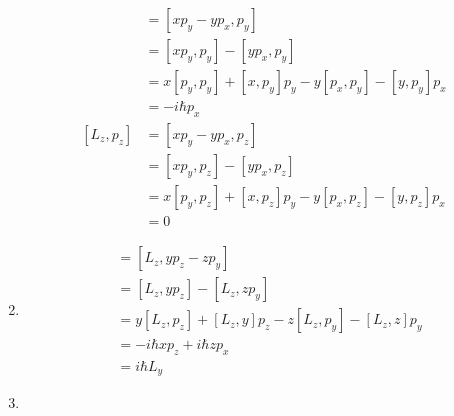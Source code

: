 \documentclass{article}
\begin{document}
\begin{enumerate}
\begin{align*}
          [L_z, p_y] & = [x p_y - y p_x, p_y]                                      \\
                     & = [x p_y, p_y] - [y p_x, p_y]                               \\
                     & = x [p_y, p_y] + [x, p_y] p_y - y [p_x, p_y] - [y, p_y] p_x \\
                     & = -i \hbar p_x                                              \\
          [L_z, p_z] & = [x p_y - y p_x, p_z]                                      \\
                     & = [x p_y, p_z] - [y p_x, p_z]                               \\
                     & = x [p_y, p_z] + [x, p_z] p_y - y [p_x, p_z] - [y, p_z] p_x \\
                     & = 0
        \end{align*}

  \item

        \begin{align*}
          [L_z, L_x] & = [L_z, y p_z - z p_y]                                      \\
                     & = [L_z, y p_z] - [L_z, z p_y]                               \\
                     & = y [L_z, p_z] + [L_z, y] p_z - z [L_z, p_y] - [L_z, z] p_y \\
                     & = -i \hbar x p_z + i \hbar z p_x                            \\
                     & = i \hbar L_y
        \end{align*}

  \item


\end{enumerate}
\end{document}
